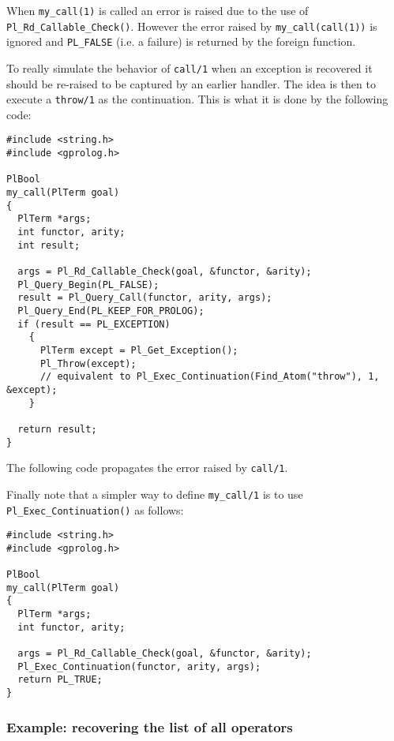 When \texttt{my\_call(1)} is called an error is raised due to the use of
\texttt{Pl\_Rd\_Callable\_Check()}. However the error raised by
\texttt{my\_call(call(1))} is ignored and \texttt{PL\_FALSE} (i.e. a failure) is
returned by the foreign function.

To really simulate the behavior of \texttt{call/1} when an exception
is recovered it should be re-raised to be captured by an earlier
handler. The idea is then to execute a \texttt{throw/1} as the
continuation. This is what it is done by the following code:

\begin{Indentation}
\begin{verbatim}
#include <string.h>
#include <gprolog.h>

PlBool
my_call(PlTerm goal)
{
  PlTerm *args;
  int functor, arity;
  int result;

  args = Pl_Rd_Callable_Check(goal, &functor, &arity);
  Pl_Query_Begin(PL_FALSE);
  result = Pl_Query_Call(functor, arity, args);
  Pl_Query_End(PL_KEEP_FOR_PROLOG);
  if (result == PL_EXCEPTION)
    {
      PlTerm except = Pl_Get_Exception();
      Pl_Throw(except); 
      // equivalent to Pl_Exec_Continuation(Find_Atom("throw"), 1, &except);
    }

  return result;
}
\end{verbatim}
\end{Indentation}

The following code propagates the error raised by \texttt{call/1}.

\begin{CodeTwoCols}
\end{CodeTwoCols}

Finally note that a simpler way to define \texttt{my\_call/1} is to use
\texttt{Pl\_Exec\_Continuation()} as follows:

\begin{Indentation}
\begin{verbatim}
#include <string.h>
#include <gprolog.h>

PlBool
my_call(PlTerm goal)
{
  PlTerm *args;
  int functor, arity;

  args = Pl_Rd_Callable_Check(goal, &functor, &arity);
  Pl_Exec_Continuation(functor, arity, args);
  return PL_TRUE;
}
\end{verbatim}
\end{Indentation}

\subsubsection{Example: recovering the list of all operators}

